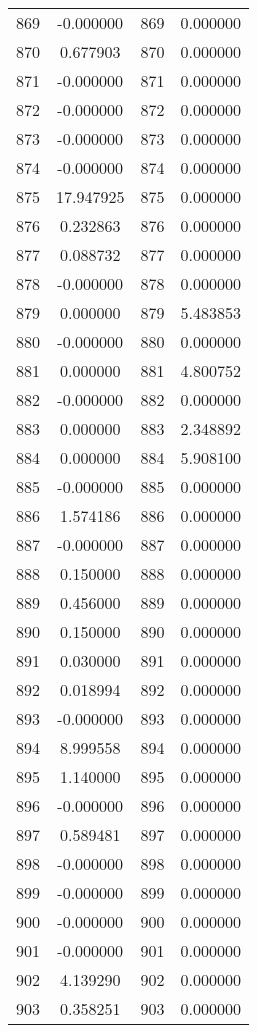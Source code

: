 \documentclass[12pt]{article}
\begin{document}
\begin{longtable}{@{}cccc@{}}
869 & -0.000000 & 869 & 0.000000 \\
870 & 0.677903 & 870 & 0.000000 \\
871 & -0.000000 & 871 & 0.000000 \\
872 & -0.000000 & 872 & 0.000000 \\
873 & -0.000000 & 873 & 0.000000 \\
874 & -0.000000 & 874 & 0.000000 \\
875 & 17.947925 & 875 & 0.000000 \\
876 & 0.232863 & 876 & 0.000000 \\
877 & 0.088732 & 877 & 0.000000 \\
878 & -0.000000 & 878 & 0.000000 \\
879 & 0.000000 & 879 & 5.483853 \\
880 & -0.000000 & 880 & 0.000000 \\
881 & 0.000000 & 881 & 4.800752 \\
882 & -0.000000 & 882 & 0.000000 \\
883 & 0.000000 & 883 & 2.348892 \\
884 & 0.000000 & 884 & 5.908100 \\
885 & -0.000000 & 885 & 0.000000 \\
886 & 1.574186 & 886 & 0.000000 \\
887 & -0.000000 & 887 & 0.000000 \\
888 & 0.150000 & 888 & 0.000000 \\
889 & 0.456000 & 889 & 0.000000 \\
890 & 0.150000 & 890 & 0.000000 \\
891 & 0.030000 & 891 & 0.000000 \\
892 & 0.018994 & 892 & 0.000000 \\
893 & -0.000000 & 893 & 0.000000 \\
894 & 8.999558 & 894 & 0.000000 \\
895 & 1.140000 & 895 & 0.000000 \\
896 & -0.000000 & 896 & 0.000000 \\
897 & 0.589481 & 897 & 0.000000 \\
898 & -0.000000 & 898 & 0.000000 \\
899 & -0.000000 & 899 & 0.000000 \\
900 & -0.000000 & 900 & 0.000000 \\
901 & -0.000000 & 901 & 0.000000 \\
902 & 4.139290 & 902 & 0.000000 \\
903 & 0.358251 & 903 & 0.000000 \\

\end{longtable}
\end{document}
